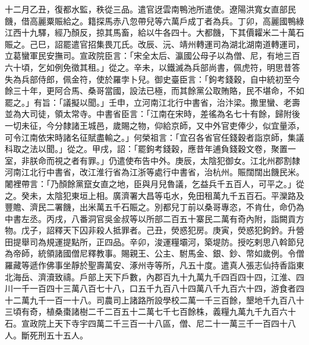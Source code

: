 \begin{pinyinscope}
 十二月乙丑，復都水監，秩從三品。遣官迓雲南鴨池所遣使。遼陽洪寬女直部民饑，借高麗粟賑給之。籍探馬赤八忽帶兒等六萬戶成丁者為兵。丁卯，高麗國鴨綠江西十九驛，經乃顏反，掠其馬畜，給以牛各四十。大都饑，下其價糶米二十萬石賑之。己巳，詔罷遣官招集畏兀氏。改辰、沅、靖州轉運司為湖北湖南道轉運司，立葛蠻軍民安撫司。宣政院臣言：「宋全太后、瀛國公母子以為僧、尼，有地三百六十頃，乞如例免徵其租。」從之。辛未，以鐵滅為兵部尚書，佩虎符，明思昔答失為兵部侍郎，佩金符，使於羅孛卜兒。御史臺臣言：「鉤考錢穀，自中統初至今餘三十年，更阿合馬、桑哥當國，設法已極，而其餘黨公取賄賂，民不堪命，不如罷之。」有旨：「議擬以聞。」壬申，立河南江北行中書省，治汴梁。撒里蠻、老壽並為大司徒，領太常寺。中書省臣言：「江南在宋時，差徭為名七十有餘，歸附後一切未征，今分隸諸王城邑，歲賜之物，仰給京師，又中外官吏俸少，似宜量添，可令江南依宋時諸名征賦盡輸之。」何榮祖言：「宜召各省官任錢穀者詣京師，集議科取之法以聞。」從之。甲戌，詔：「罷鉤考錢穀，應昔年逋負錢穀文卷，聚置一室，非朕命而視之者有罪。」仍遣使布告中外。庚辰，太陰犯御女。江北州郡割隸河南江北行中書省，改江淮行省為江浙等處行中書省，治杭州。賑闊闊出饑民米。闍裡帶言：「乃顏餘黨竄女直之地，臣與月兒魯議，乞益兵千五百人，可平之。」從之。癸未，太陰犯東垣上相。廣濟署大昌等屯水，免田租萬九千五百石。平灤路及豐贍、濟民二署饑，出米萬五千石賑之。別都兒丁前以桑哥專恣，不肯仕，命仍為中書左丞。丙戌，八番洞官吳金叔等以所部二百五十寨民二萬有奇內附，詣闕貢方物。戊子，詔釋天下囚非殺人抵罪者。己丑，熒惑犯房。庚寅，熒惑犯鉤鈐。升營田提舉司為規運提點所，正四品。辛卯，浚運糧壩河，築堤防。授吃剌思八斡節兒為帝師，統領諸國僧尼釋教事。賜親王、公主、駙馬金、銀、鈔、幣如歲例。令僧羅藏等遞作佛事坐靜於聖壽萬安、涿州寺等所，凡五十度。遣真人張志仙持香詣東北海岳、濟瀆致禱。戶部上天下戶數，內郡百九十九萬九千四百四十四，江淮、四川一千一百四十三萬八百七十八，口五千九百八十四萬八千九百六十四，游食者四十二萬九千一百一十八。司農司上諸路所設學校二萬一千三百餘，墾地千九百八十三頃有奇，植桑棗諸樹二千二百五十二萬七千七百餘株，義糧九萬九千九百六十石。宣政院上天下寺宇四萬二千三百一十八區，僧、尼二十一萬三千一百四十八人。斷死刑五十五人。



\end{pinyinscope}